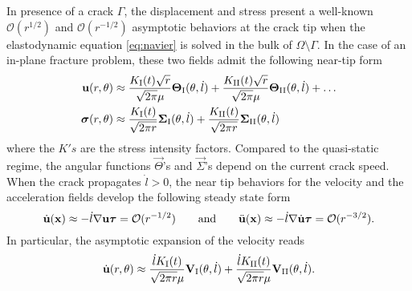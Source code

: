 In presence of a crack $\Gamma$, the displacement and stress present a well-known $\mathcal{O}(r^{1/2})$ and $\mathcal{O}(r^{-1/2})$ asymptotic behaviors at the crack tip when the elastodynamic equation \eqref{eq:navier} is solved in the bulk of $\Omega\setminus\Gamma$. In the case of an in-plane fracture problem, these two fields admit the following near-tip form
\begin{equation} \label{eq:singularform}
\begin{aligned}
\vec{u}(r,\theta) &\approx \frac{K_\RN{1}(t)\sqrt{r}}{\sqrt{2\pi}\mu}\vec{\Theta}_\RN{1}(\theta,\dot{l})+\frac{K_\RN{2}(t)\sqrt{r}}{\sqrt{2\pi}\mu}\vec{\Theta}_\RN{2}(\theta,\dot{l})+\ldots \\
\sig(r,\theta) &\approx \frac{K_\RN{1}(t)}{\sqrt{2\pi r}}\vec{\Sigma}_\RN{1}(\theta,\dot{l})+\frac{K_\RN{2}(t)}{\sqrt{2\pi r}}\vec{\Sigma}_\RN{2}(\theta,\dot{l})
\end{aligned}
\end{equation}
where the $K's$ are the stress intensity factors. Compared to the quasi-static regime, the angular functions $\vec{\Theta}$'s and $\vec{\Sigma}$'s depend on the current crack speed. When the crack propagates $\dot{l}>0$, the near tip behaviors for the velocity and the acceleration fields develop the following steady state form
\begin{equation} \label{eq:steadystatecondition}
\dot{\vec{u}}(\vec{x})\approx -\dot{l}\nabla\vec{u}\vtau=\mathcal{O}(r^{-1/2})\qquad\text{and}\qquad\ddot{\vec{u}}(\vec{x})\approx -\dot{l}\nabla\dot{\vec{u}}\vtau=\mathcal{O}(r^{-3/2}).
\end{equation}
In particular, the asymptotic expansion of the velocity reads
\begin{equation} \label{eq:vasymp}
\dot{\vec{u}}(r,\theta)\approx\frac{\dot{l}K_\RN{1}(t)}{\sqrt{2\pi r}\mu}\vec{V}_\RN{1}(\theta,\dot{l})+\frac{\dot{l}K_\RN{2}(t)}{\sqrt{2\pi r}\mu}\vec{V}_\RN{2}(\theta,\dot{l}).
\end{equation}

